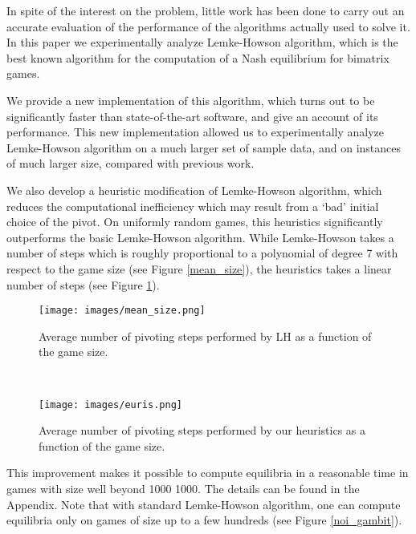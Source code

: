 \documentclass[11pt]{article}
\begin{document}
In spite of the interest on the problem, little work has been done
to carry out an accurate evaluation of the performance of the
algorithms actually used to solve it. In this paper we
experimentally analyze Lemke-Howson algorithm, which is the best
known algorithm for the computation of a Nash equilibrium for
bimatrix games.

We  provide a new implementation of this algorithm, which turns out
to be significantly faster than state-of-the-art software, and give
an account of its performance. This new implementation allowed us to
experimentally analyze Lemke-Howson algorithm on a much larger set
of sample data, and on instances of much larger size, compared with
previous work.

We also develop a heuristic modification of Lemke-Howson
algorithm, which reduces the computational inefficiency which may
result from a `bad' initial choice of the pivot. On uniformly random
games, this heuristics significantly outperforms the basic
Lemke-Howson algorithm. While Lemke-Howson takes a number of steps which is roughly
proportional to a
polynomial of degree 7 with respect to the game size (see Figure
\ref{mean_size}), the heuristics takes a linear number of steps
(see Figure \ref{mean_size_heu}).

\begin{center}
\begin{figure}[h]
\begin{minipage}[t]{6cm}
\centering
\texttt{[image: images/mean\_size.png]}
\caption{Average number of pivoting steps performed by LH as a
function of the game size.}
\label{mean_size}
\end{minipage}
\ \hspace{2mm} \hspace{3mm} \
\begin{minipage}[t]{6cm}
\centering
\texttt{[image: images/euris.png]}
\caption{Average number of pivoting steps performed by our heuristics
as a function of the game size.}
\label{mean_size_heu}
\end{minipage}
\end{figure}
\end{center}

This improvement makes it possible to compute equilibria in a reasonable time 
in games with size well beyond 1000  1000. The details can be found in the Appendix.
Note that with standard Lemke-Howson algorithm, one can compute equilibria only on games
of size up to a few hundreds (see Figure \ref{noi_gambit}).
\end{document}
